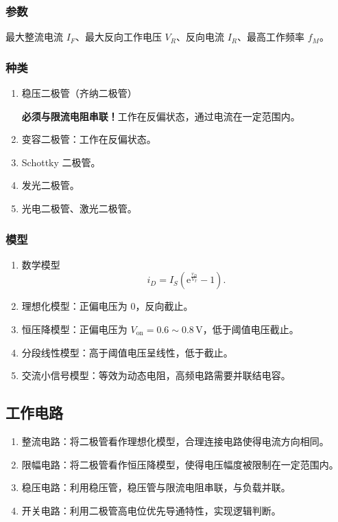 \documentclass[UTF8,fontset=fandol,zihao=5]{ctexart}
\newcommand{\ee}{\mathrm{e}}
\begin{document}
\subsubsection{参数}

最大整流电流 $I_F$、最大反向工作电压 $V_R$、反向电流 $I_R$、最高工作频率 $f_M$。

\subsubsection{种类}

\begin{enumerate}
  \item 稳压二极管（齐纳二极管）

  \textbf{必须与限流电阻串联！}工作在反偏状态，通过电流在一定范围内。
  \item 变容二极管：工作在反偏状态。
  \item Schottky 二极管。
  \item 发光二极管。
  \item 光电二极管、激光二极管。
\end{enumerate}

\subsubsection{模型}

\begin{enumerate}
  \item 数学模型
  \[
    i_D=I_S\left(\ee^{\frac{v_D}{V_T}}-1\right).
  \]
  \item 理想化模型：正偏电压为 0，反向截止。
  \item 恒压降模型：正偏电压为 $V_{\mathrm{on}}=0.6\sim0.8\,\mathrm V$，低于阈值电压截止。
  \item 分段线性模型：高于阈值电压呈线性，低于截止。
  \item 交流小信号模型：等效为动态电阻，高频电路需要并联结电容。
\end{enumerate}

\subsection{工作电路}

\begin{methodbox}[【方法】二极管工作电路]
\begin{enumerate}
  \item 整流电路：将二极管看作理想化模型，合理连接电路使得电流方向相同。
  \item 限幅电路：将二极管看作恒压降模型，使得电压幅度被限制在一定范围内。
  \item 稳压电路：利用稳压管，稳压管与限流电阻串联，与负载并联。
  \item 开关电路：利用二极管高电位优先导通特性，实现逻辑判断。
\end{enumerate}
\end{methodbox}
\end{document}
